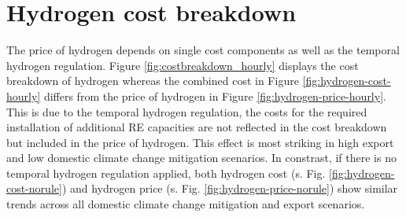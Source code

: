 \section{Hydrogen cost breakdown}
\label{subsec:electrolysis_op_comp}

The price of hydrogen depends on single cost components as well as the temporal hydrogen regulation. Figure \ref{fig:costbreakdown_hourly} displays the cost breakdown of hydrogen 
whereas the combined cost in Figure \ref{fig:hydrogen-cost-hourly} differs from the price of hydrogen in Figure \ref{fig:hydrogen-price-hourly}. This is due to the temporal hydrogen regulation, the costs for the required installation of additional RE capacities are not reflected in the cost breakdown but included in the price of hydrogen. This effect is most striking in high export and low domestic climate change mitigation scenarios. 
In constrast, if there is no temporal hydrogen regulation applied, both hydrogen cost (s. Fig. \ref{fig:hydrogen-cost-norule}) and hydrogen price (s. Fig. \ref{fig:hydrogen-price-norule}) show similar trends across all domestic climate change mitigation and export scenarios.


